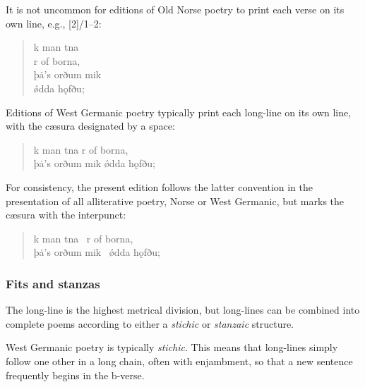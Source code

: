     It is not uncommon for editions of Old Norse poetry to print each verse on its own line, e.g., [2]/1--2:

    \begin{quote}\begin{small}
      k man tna \\
      r of borna, \\
      þȧ’s orðum mik \\
      ǿdda hǫfðu;
    \end{small}\end{quote}

    Editions of West Germanic poetry typically print each long-line on its own line, with the cæsura designated by a space:

    \begin{quote}\begin{small}
      k man tna \hspace*{1em} r of borna, \\
      þȧ’s orðum mik \hspace*{1em} ǿdda hǫfðu;
    \end{small}\end{quote}

    For consistency, the present edition follows the latter convention in the presentation of all alliterative poetry, Norse or West Germanic, but marks the cæsura with the interpunct:

    \begin{quote}\begin{small}
      k man tna \hld\ r of borna, \\
      þȧ’s orðum mik \hld\ ǿdda hǫfðu;
    \end{small}\end{quote}

    \subsubsection{Fits and stanzas}

    The long-line is the highest metrical division, but long-lines can be combined into complete poems according to either a \emph{stichic} or \emph{stanzaic} structure.

    West Germanic poetry is typically \emph{stichic}.  This means that long-lines simply follow one other in a long chain, often with enjambment, so that a new sentence frequently begins in the b-verse.

